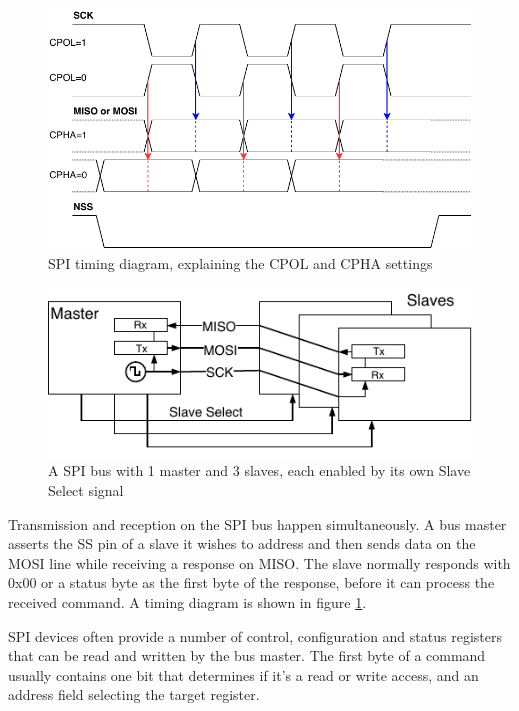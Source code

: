 \begin{figure}[h]
	\centering
	\includegraphics[scale=.9] {img/spi-timing.pdf}
	\caption{\label{fig:spi-timing}SPI timing diagram, explaining the CPOL and CPHA settings}
\end{figure}

\begin{figure}[h]
\centering
\includegraphics[scale=1.1] {img/spi-multislave-redraw.pdf}
\caption[SPI master with multiple slaves]{\label{fig:spi-multislave}A SPI bus with 1 master and 3 slaves, each enabled by its own Slave Select signal}
\end{figure}

Transmission and reception on the \gls{SPI} bus happen simultaneously. A bus master asserts the SS pin of a slave it wishes to address and then sends data on the \gls{MOSI} line while receiving a response on \gls{MISO}. The slave normally responds with 0x00 or a status byte as the first byte of the response, before it can process the received command. A timing diagram is shown in figure \ref{fig:spi-timing}.

\gls{SPI} devices often provide a number of control, configuration and status registers that can be read and written by the bus master. The first byte of a command usually contains one bit that determines if it's a read or write access, and an address field selecting the target register.
\pagebreak[1] %
